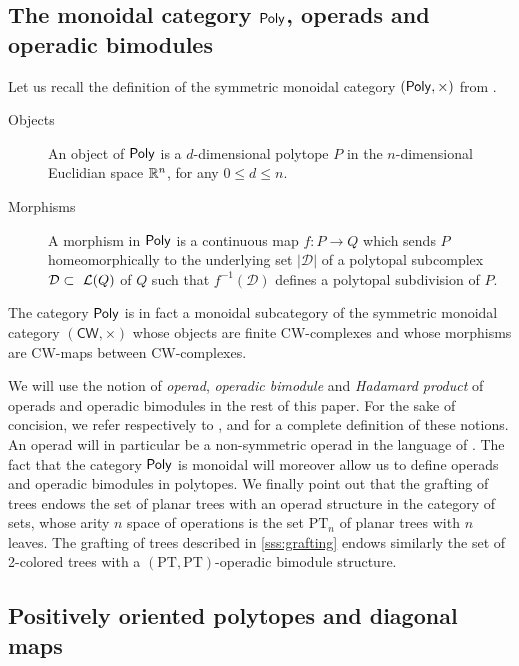 \documentclass[twoside, 11pt]{amsart}
\theoremstyle{remark}
\begin{document}
 
\subsection{The monoidal category $\mathsf{Poly}$, operads and operadic bimodules}

Let us recall the definition of the symmetric monoidal category $(\mathsf{Poly}, \times)$ from \cite[Section~2.1]{MTTV19}.
\begin{description}
\item[{\sc Objects}] An object of $\mathsf{Poly}$ is a $d$-dimensional  polytope $P$ in the $n$-dimensional Euclidian space $\mathbb{R}^n$, for any $0\leq d\leq n$.
\item[{\sc Morphisms}] A morphism in $\mathsf{Poly}$ is a continuous map  $f: P\to Q$ which sends  $P$ homeomorphically to the underlying set $|\mathcal{D}|$ of a polytopal subcomplex $\mathcal{D}\subset~\mathcal{L}(Q)$ of $Q$ 
such that $f^{-1}(\mathcal D)$ defines a polytopal subdivision of $P$.
\end{description}
The category $\mathsf{Poly}$ is in fact a monoidal subcategory of the symmetric monoidal category $(\mathsf{CW},\times )$ whose objects are finite CW-complexes and whose morphisms are CW-maps between CW-complexes.

We will use the notion of \textit{operad}, \textit{operadic bimodule} and \textit{Hadamard product} of operads and operadic bimodules in the rest of this paper. For the sake of concision, we refer respectively to \cite[Section 1.1.1]{mazuir-I}, \cite[Section 1.1.3]{mazuir-I} and \cite[Section 5.1.12]{LodayVallette12} for a complete definition of these notions. An operad will in particular be a non-symmetric operad in the language of \cite{LodayVallette12}. The fact that the category $\mathsf{Poly}$ is monoidal will moreover allow us to define operads and operadic bimodules in polytopes. 
We finally point out that the grafting of trees endows the set of planar trees with an operad structure in the category of sets, whose arity $n$ space of operations is the set $\mathrm{PT}_n$ of planar trees with $n$ leaves. 
The grafting of trees described in \cref{sss:grafting} endows similarly the set of 2-colored trees with a $(\mathrm{PT},\mathrm{PT})$-operadic bimodule structure. 

\subsection{Positively oriented polytopes and diagonal maps}
\end{document}
